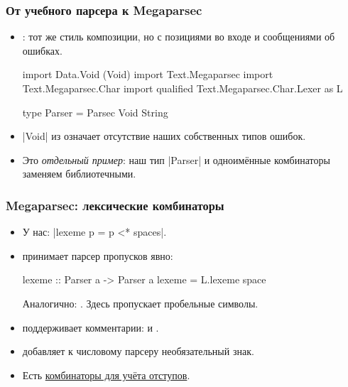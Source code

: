 \documentclass[11pt]{beamer}
\begin{document}
\begin{frame}[fragile]
  \frametitle{От учебного парсера к Megaparsec}
  \begin{itemize}
    \item {}: тот же стиль композиции, но с позициями во входе и сообщениями об ошибках.
      \begin{haskellsmall}
        import Data.Void (Void)
        import Text.Megaparsec
        import Text.Megaparsec.Char
        import qualified Text.Megaparsec.Char.Lexer as L

        type Parser = Parsec Void String
      \end{haskellsmall}
    \item \haskinline|Void| из \href{https://hackage.haskell.org/package/base/docs/Data-Void.html}{} означает отсутствие наших собственных типов ошибок.
      \pause
    \item Это \emph{отдельный пример}: наш тип \haskinline|Parser| и одноимённые комбинаторы заменяем библиотечными.
  \end{itemize}
\end{frame}

\begin{frame}[fragile]
  \frametitle{Megaparsec: лексические комбинаторы}
  \begin{itemize}
    \item У нас: \haskinline|lexeme p = p <* spaces|.
    \item \href{https://hackage.haskell.org/package/megaparsec/docs/Text-Megaparsec-Char-Lexer.html#v:lexeme}{} принимает парсер пропусков явно:
      \begin{haskellsmall}
        lexeme :: Parser a -> Parser a
        lexeme = L.lexeme space
      \end{haskellsmall}
      Аналогично: \href{https://hackage.haskell.org/package/megaparsec/docs/Text-Megaparsec-Char-Lexer.html#v:symbol}{}. Здесь \href{https://hackage.haskell.org/package/megaparsec/docs/Text-Megaparsec-Char.html#v:space}{} пропускает пробельные символы.
    \item \href{https://hackage.haskell.org/package/megaparsec/docs/Text-Megaparsec-Char-Lexer.html#v:space}{} поддерживает комментарии: \href{https://hackage.haskell.org/package/megaparsec/docs/Text-Megaparsec-Char-Lexer.html#v:skipLineComment}{} и \href{https://hackage.haskell.org/package/megaparsec/docs/Text-Megaparsec-Char-Lexer.html#v:skipBlockComment}{}.
    \item \href{https://hackage.haskell.org/package/megaparsec/docs/Text-Megaparsec-Char-Lexer.html#v:signed}{} добавляет к числовому парсеру необязательный знак.
    \item Есть \href{https://hackage.haskell.org/package/megaparsec/docs/Text-Megaparsec-Char-Lexer.html#v:indentBlock}{комбинаторы для учёта отступов}.
  \end{itemize}
\end{frame}
\end{document}
